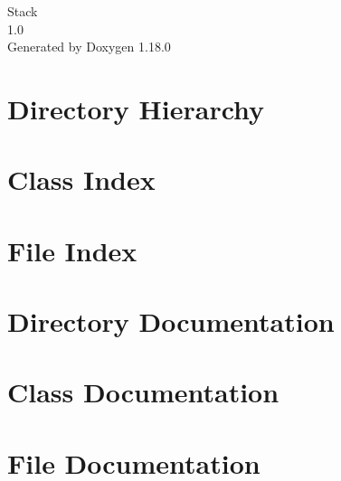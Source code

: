\documentclass[twoside]{book}
\newcommand{\+}{\discretionary{\mbox{\scriptsize$\hookleftarrow$}}{}{}}
\newcommand{\clearemptydoublepage}{%
    \newpage{\pagestyle{empty}\cleardoublepage}%
  }
\begin{document}
  \raggedbottom
    \hypersetup{pageanchor=false,
                bookmarksnumbered=true,
                pdfencoding=unicode
               }
  \begin{titlepage}
  \vspace*{7cm}
  \begin{center}%
  {\Large Stack}\\
  [1ex]\large 1.\+0 \\
  \vspace*{1cm}
  {\large Generated by Doxygen 1.18.0}\\
  \end{center}
  \end{titlepage}
  \clearemptydoublepage
  \tableofcontents
  \clearemptydoublepage
  \hypersetup{pageanchor=true}
\chapter{Directory Hierarchy}

\chapter{Class Index}

\chapter{File Index}

\chapter{Directory Documentation}

\chapter{Class Documentation}


\chapter{File Documentation}


















  \backmatter
  \newpage
  \clearemptydoublepage
  \printindex
\end{document}
